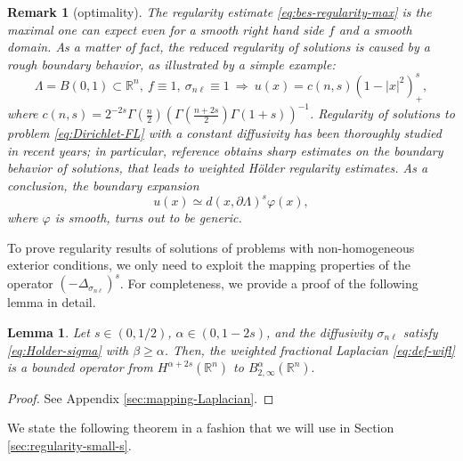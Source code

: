 \documentclass{amsart}
\newcommand{\domain}{\Lambda}
\newcommand{\snl}{{\sigma_{n\ell}}}
\def\R{{\mathbb R}}
\theoremstyle{plain}
\newtheorem{lemma}{Lemma}
\newtheorem{remark}{Remark}
\numberwithin{equation}{section}
\numberwithin{table}{section}
\numberwithin{figure}{section}
\numberwithin{theorem}{section}
\numberwithin{corollary}{section}
\numberwithin{definition}{section}
\numberwithin{lemma}{section}
\numberwithin{proposition}{section}
\numberwithin{remark}{section}
\begin{document}
\begin{remark}[optimality]
The regularity estimate \eqref{eq:bes-regularity-max} is the maximal one can expect even for a smooth right hand side $f$ and a smooth domain. As a matter of fact, the reduced regularity of solutions is caused by a rough boundary behavior, as illustrated by a simple example:
\[
\domain = B(0,1)\subset\R^n, \ f \equiv 1, \ \snl \equiv 1 \ \Rightarrow \ u(x) = c(n,s) (1-|x|^2)^s_+,
\]
where $c(n,s)= 2^{-2s}\Gamma(\frac{n}{2})\left(\Gamma(\frac{n+2s}{2})\Gamma(1+s)\right)^{-1}$.
Regularity of solutions to problem \eqref{eq:Dirichlet-FL} with a constant diffusivity has been thoroughly studied in recent years; in particular, reference \cite{RosOtonSerra} obtains sharp estimates on the boundary behavior of solutions, that leads to weighted H\"older regularity estimates. As a conclusion, the boundary expansion
\[
u(x) \simeq d(x, \partial\domain)^s \varphi(x),
\]
where $\varphi$ is smooth, turns out to be generic.
\end{remark}

To prove regularity results of solutions of problems with non-homogeneous exterior conditions, we only need to exploit the mapping properties of the operator $(-\Delta_\snl)^s$. For completeness, we provide a proof of the following lemma in detail.

\begin{lemma}\label{lemma:mapping-Laplacian}
Let $s \in (0,1/2)$, $\alpha \in (0, 1-2s)$, and the diffusivity $\snl$ satisfy \eqref{eq:Holder-sigma} with $\beta \ge \alpha$. Then, the weighted fractional Laplacian \eqref{eq:def-wifl} is a bounded operator from $H^{\alpha+2s} (\R^n)$ to $B^{\alpha}_{2,\infty}(\R^n).$
\end{lemma}
\begin{proof}
See Appendix \ref{sec:mapping-Laplacian}.
\end{proof}

We state the following theorem in a fashion that we will use in Section \ref{sec:regularity-small-s}. 
\end{document}
